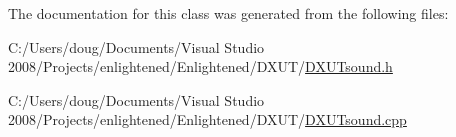The documentation for this class was generated from the following files:\begin{DoxyCompactItemize}
\item 
C:/Users/doug/Documents/Visual Studio 2008/Projects/enlightened/Enlightened/DXUT/\hyperlink{_d_x_u_tsound_8h}{DXUTsound.h}\item 
C:/Users/doug/Documents/Visual Studio 2008/Projects/enlightened/Enlightened/DXUT/\hyperlink{_d_x_u_tsound_8cpp}{DXUTsound.cpp}\end{DoxyCompactItemize}
